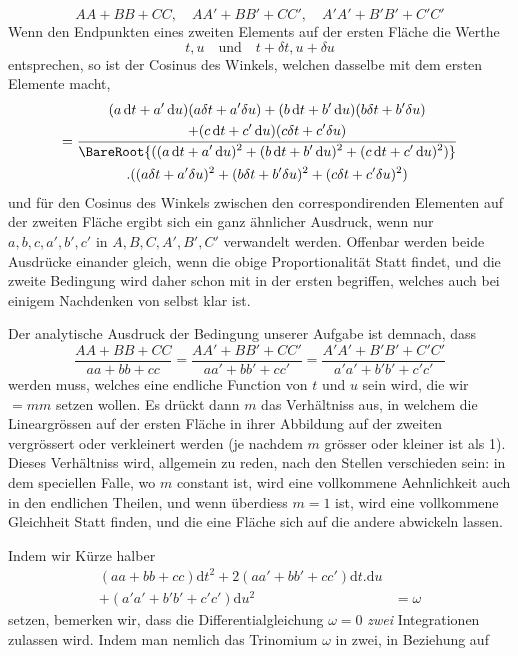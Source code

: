\[
AA+BB+CC,\quad AA'+BB'+CC',\quad A'A'+B'B'+C'C'
\]
\noindent Wenn den Endpunkten eines zweiten Elements auf der ersten Fläche die Werthe
\[
t,u\quad\text{und}\quad t+\delta t,u+\delta u
\]
\noindent entsprechen, so ist der Cosinus des Winkels, welchen dasselbe mit dem ersten Elemente macht,
\[
=\frac{\begin{gathered}(a\,\mathrm{d}t+a'\,\mathrm{d}u)(a\delta t+a'\delta u)+(b\,\mathrm{d}t+b'\,\mathrm{d}u)(b\delta t+b'\delta u)\\+(c\,\mathrm{d}t+c'\,\mathrm{d}u)(c\delta t+c'\delta u)\end{gathered}}{\begin{gathered}\BareRoot{((a\,\mathrm{d}t+a'\,\mathrm{d}u)^2+(b\,\mathrm{d}t+b'\,\mathrm{d}u)^2+(c\,\mathrm{d}t+c'\,\mathrm{d}u)^2)}\\\mathord{.}((a\delta t+a'\delta u)^2+(b\delta t+b'\delta u)^2+(c\delta t+c'\delta u)^2)\end{gathered}}
\]
\noindent und für den Cosinus des Winkels zwischen den correspondirenden Elementen auf der zweiten Fläche ergibt sich ein ganz ähnlicher Ausdruck, wenn nur \(a,b,c,a',b',c'\) in \(A,B,C,A',B',C'\) verwandelt werden. Offenbar werden beide Ausdrücke einander gleich, wenn die obige Proportionalität Statt findet, und die zweite Bedingung wird daher schon mit in der ersten begriffen, welches auch bei einigem Nachdenken von selbst klar ist.

Der analytische Ausdruck der Bedingung unserer Aufgabe ist demnach, dass
\[
\frac{AA+BB+CC}{aa+bb+cc}=\frac{AA'+BB'+CC'}{aa'+bb'+cc'}=\frac{A'A'+B'B'+C'C'}{a'a'+b'b'+c'c'}
\]
\noindent werden muss, welches eine endliche Function von \(t\) und \(u\) sein wird, die wir \(=mm\) setzen wollen. Es drückt dann \(m\) das Verhältniss aus, in welchem die Lineargrössen auf der ersten Fläche in ihrer Abbildung auf der zweiten vergrössert oder verkleinert werden (je nachdem \(m\) grösser oder kleiner ist als 1). Dieses Verhältniss wird, allgemein zu reden, nach den Stellen verschieden sein: in dem speciellen Falle, wo \(m\) constant ist, wird eine vollkommene Aehnlichkeit auch in den endlichen Theilen, und wenn überdiess \(m=1\) ist, wird eine vollkommene Gleichheit Statt finden, und die eine Fläche sich auf die andere abwickeln lassen.

Indem wir Kürze halber
\[
\begin{aligned}
(aa+bb+cc)\mathrm{d}t^2+2(aa'+bb'+cc')\mathrm{d}t\mathord{.}\mathrm{d}u&\\
+(a'a'+b'b'+c'c')\mathrm{d}u^2&=\omega
\end{aligned}
\]
\noindent setzen, bemerken wir, dass die Differentialgleichung \(\omega=0\) \textit{zwei} Integrationen zulassen wird. Indem man nemlich das Trinomium \(\omega\) in zwei, in Beziehung auf
